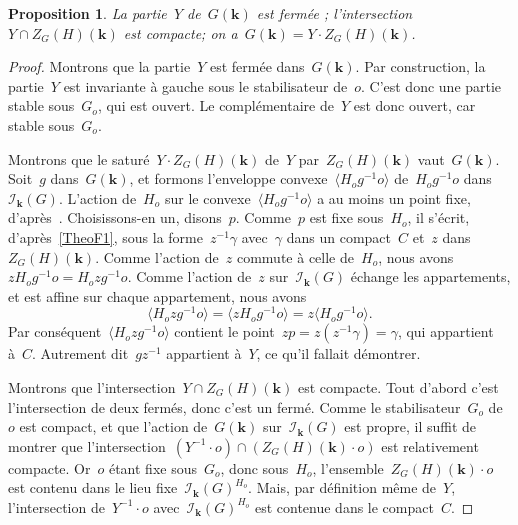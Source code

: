 \documentclass[french]{amsart}
\newcommand{\kk}{\mathbf{k}}
\newcommand{\Ik}{\mathscr{I}_\kk}
\newtheorem{proposition}{Proposition}[section]
\begin{document}
\begin{proposition}\label{Prop21}
La partie~$Y$ de~$G(\kk)$ est fermée ; l'intersection~$Y \cap Z_G (H)(\kk)$ est compacte; on a~$G(\kk) = Y \cdot Z_G (H)(\kk)$.
\end{proposition}
\begin{proof}
Montrons que la partie~$Y$ est fermée dans~$G(\kk)$. Par construction,
la partie~$Y$ est invariante à gauche sous le stabilisateur de~$o$. C'est donc une partie stable sous~$G_o$, qui est ouvert. Le complémentaire de~$Y$ est donc ouvert, car
stable sous~$G_o$.

Montrons que le saturé~$Y \cdot Z_G (H)(\kk)$ de~$Y$ par~$Z_G (H)(\kk)$ vaut~$G(\kk)$. Soit~$g$
dans~$G(\kk)$, et formons l'enveloppe convexe~$\langle H_o g^{-1}o\rangle$ de~$H_o g^{
-1}o$ dans~$\Ik(G)$.
L'action de~$H_o$ sur le convexe~$\langle H_o g^{-1}o\rangle$ a au moins un point fixe, d'après~\cite[2.3.1]{Tit79}. Choisissons-en un, disons~$p$. Comme~$p$ est fixe sous~$H_o$, il s'écrit, d'après~\ref{TheoF1}, sous
la forme~$z^{-1}\gamma$ avec~$\gamma$ dans un compact~$C$ et~$z$ dans~$Z_G (H)(\kk)$.
Comme l'action de~$z$ commute à celle de~$H_o$, nous avons~$zH_o g^{
-1}o = H_o zg^{-1}o$. Comme l'action de~$z$ sur~$\Ik(G)$
échange les appartements, et est affine sur chaque appartement, nous avons
\begin{equation*}
\langle H_o zg^{-1}o \rangle=\langle z H_o g^{-1}o \rangle=z\langle H_o g^{-1}o \rangle.
\end{equation*}
Par conséquent~$\langle H_o zg^{-1}o \rangle$ contient le point~$zp = z(z^{-1}\gamma) = \gamma$, qui appartient à~$C$.
Autrement dit~$g z^{-1}$ appartient à~$Y$, ce qu'il fallait démontrer.

Montrons que l'intersection~$Y \cap Z_G (H)(\kk)$ est compacte. Tout d'abord c'est l'intersection de deux fermés, donc c'est un fermé. Comme le stabilisateur~$G_o$ de~$o$ est compact, et que l'action de~$G(\kk)$ sur~$\Ik(G)$ est propre, il suffit de montrer que l'intersection~$(Y^{-1}\cdot o)\cap(Z_G (H)(\kk)\cdot o)$ est relativement compacte. Or~$o$ étant fixe sous~$G_o$, donc sous~$H_o$, l'en\-sem\-ble~$Z_G (H)(\kk) \cdot o$ est contenu dans le lieu fixe~$\Ik(G)^{H_o}$. Mais, par définition même de~$Y$, l'intersection de~$Y^{-1}\cdot o$ avec~$\Ik(G)^{H_o}$ est contenue dans le compact~$C$.
\end{proof}
\end{document}
